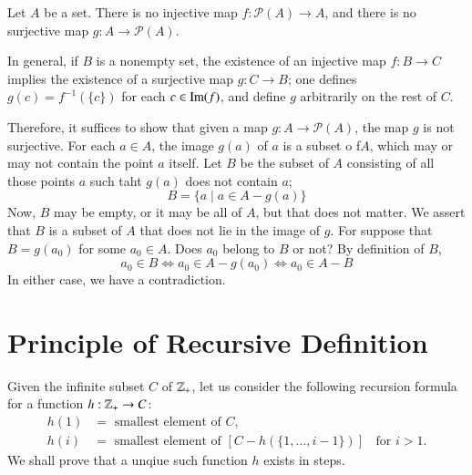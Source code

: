 \documentclass[12pt, a4paper, twoside, openright, titlepage]{book}
\begin{document}
\begin{appendices}
    \begin{thm}{}{}
        Let $A$ be a set. There is no injective map $f:\mathscr{P}(A)\rightarrow A$, and there is no surjective map $g:A\rightarrow \mathscr{P}(A)$. 
    \end{thm}
    \begin{proof*}{}{}
        In general, if $B$ is a nonempty set, the existence of an injective map $f:B\rightarrow C$ implies the existence of a surjective map $g:C\rightarrow B$; one defines $g(c) = f^{-1}(\{c\})$ for each $c \in \operatorname{Im}(f)$, and define $g$ arbitrarily on the rest of $C$.

        Therefore, it suffices to show that given a map $g:A\rightarrow \mathscr{P}(A)$, the map $g$ is not surjective. For each $a \in A$, the image $g(a)$ of $a$ is a subset o f$A$, which may or may not contain the point $a$ itself. Let $B$ be the subset of $A$ consisting of all those points $a$ such taht $g(a)$ does not contain $a$; \begin{equation*}
            B=\{a\;\vert\;a\in A-g(a)\}
        \end{equation*}
        Now, $B$ may be empty, or it may be all of $A$, but that does not matter. We assert that $B$ is a subset of $A$ that does not lie in the image of $g$. For suppose that $B = g(a_0)$ for some $a_0 \in A$. Does $a_0$ belong to $B$ or not? By definition of $B$, \begin{equation*}
            a_0 \in B \iff a_0 \in A-g(a_0) \iff a_0 \in A-B
        \end{equation*}
        In either case, we have a contradiction.
    \end{proof*}
    

    \section{Principle of Recursive Definition}

    \begin{rmk}{}{}
        Given the infinite subset $C$ of $\mathbb Z_+$, let us consider the following recursion formula for a function $h:\mathbb Z_+\rightarrow C$:\begin{equation*}
            \begin{array}{cl} h(1) &= \text{ smallest element of $C$}, \\
            h(i) &= \text{ smallest element of } [C-h(\{1,...,i-1\})]\;\;\text{ for } i > 1.
            \end{array} \tag{$(\star)$}
        \end{equation*}
        We shall prove that a unqiue such function $h$ exists in steps.
    \end{rmk}


\end{appendices}
\end{document}
